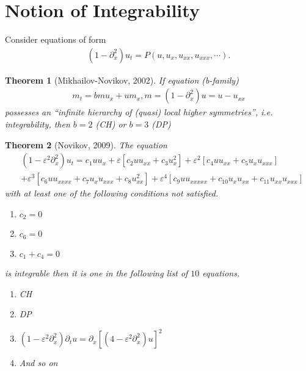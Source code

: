 \documentclass[12pt,reqno]{amsart}
\numberwithin{equation}{section}  %
\newcommand{\p}{\partial}
\newcommand{\ee}{\varepsilon}
\newtheorem{theorem}{Theorem}[section]
\begin{document}
\section{Notion of Integrability}
        \label{sec:}
Consider equations of form
%
%
\begin{equation*}
\begin{split}
  (1 - \p_x^{2})u_{t} = P(u, u_{x}, u_{xx}, u_{xxx}, \cdots).
\end{split}
\end{equation*}
%
%
%
%
%
%
%
%
%
%
\begin{theorem}[Mikhailov-Novikov, 2002]
If equation (b-family)
%
%
\begin{equation*}
\begin{split}
  m_{t} = b m u_{x} + u m_{x}, m = (1 - \p_x^{2})u = u - u_{xx}
\end{split}
\end{equation*}
%
%
possesses an ``infinite hierarchy of (quasi) local higher symmetries'', i.e.
integrability, then
$b =2$ (CH) or $b =3$ (DP)
\label{thm:main-theorem2}
\end{theorem}
%
%
%
%
%
%
%                
%
%
%
%
\begin{theorem}[Novikov, 2009]
The equation
%
%
\begin{equation*}
\begin{split}
  & (1 - \ee^{2} \p_{x}^{2})u_{t} = c_{1} uu_{x} + \ee [c_{2} u u_{xx} +
  c_{3} u_{x}^{2}] + \ee^{2}[c_{4} uu_{xx} + c_{5} u_{x}u_{xxx}]
  \\
  & +
  \ee^{3}[c_{6} u u_{xxxx} + c_{7} u_{x} u_{xxx} + c_{8}u_{xx}^{2}] +
  \ee^{4}[c_{9} u u _{xxxxx} + c_{10} u_{x} u_{xx} + c_{11} u_{xx}u_{xxx}]
\end{split}
\end{equation*}
%
with at least one of the following conditions not satisfied.
\begin{enumerate}
  \item{ $c_{2} = 0$}
  \item{$c_{6} = 0$ }
  \item{ $c_{1} + c_{4} = 0$}
\end{enumerate}
is integrable then it is one in the following list of $10$ equations.
\begin{enumerate}
 \item{CH }
 \item{ DP}
 \item{ $(1 - \ee^{2} \p_x^{2}) \p_{t} u = \p_{x} [(4 - \ee^{2}
   \p_{x}^{2})u]^{2}$}
   \item{ And so on}
\end{enumerate}
%
\label{thm:integ}
\end{theorem}
\end{document}
